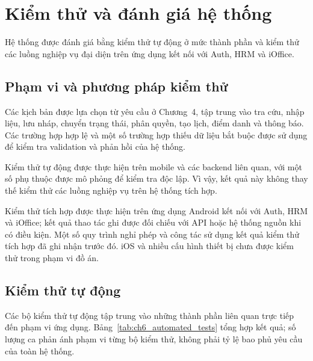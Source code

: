 \section{Kiểm thử và đánh giá hệ thống}
\label{sec:kiemthu_danhgia}

Hệ thống được đánh giá bằng kiểm thử tự động ở mức thành phần và kiểm thử các luồng nghiệp vụ đại diện trên ứng dụng kết nối với Auth, HRM và iOffice.

\subsection{Phạm vi và phương pháp kiểm thử}

Các kịch bản được lựa chọn từ yêu cầu ở Chương~4, tập trung vào tra cứu, nhập liệu, lưu nháp, chuyển trạng thái, phân quyền, tạo lịch, điểm danh và thông báo. Các trường hợp hợp lệ và một số trường hợp thiếu dữ liệu bắt buộc được sử dụng để kiểm tra validation và phản hồi của hệ thống.

Kiểm thử tự động được thực hiện trên mobile và các backend liên quan, với một số phụ thuộc được mô phỏng để kiểm tra độc lập. Vì vậy, kết quả này không thay thế kiểm thử các luồng nghiệp vụ trên hệ thống tích hợp.

Kiểm thử tích hợp được thực hiện trên ứng dụng Android kết nối với Auth, HRM và iOffice; kết quả thao tác ghi được đối chiếu với API hoặc hệ thống nguồn khi có điều kiện. Một số quy trình nghỉ phép và công tác sử dụng kết quả kiểm thử tích hợp đã ghi nhận trước đó. iOS và nhiều cấu hình thiết bị chưa được kiểm thử trong phạm vi đồ án.

\subsection{Kiểm thử tự động}

Các bộ kiểm thử tự động tập trung vào những thành phần liên quan trực tiếp đến phạm vi ứng dụng. Bảng~\ref{tab:ch6_automated_tests} tổng hợp kết quả; số lượng ca phản ánh phạm vi từng bộ kiểm thử, không phải tỷ lệ bao phủ yêu cầu của toàn hệ thống.

